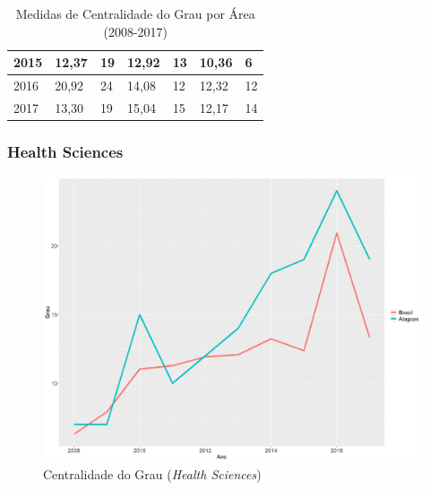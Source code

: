 \begin{table}[H]
\begin{tabular}{|l|l|l|l|l|l|l|}
		2015          & 12,37                                                  & 19                                                      & 12,92                                                     & 13                                                         & 10,36                                                       & 6                                                           \\ \hline
		2016          & 20,92                                                  & 24                                                      & 14,08                                                     & 12                                                         & 12,32                                                       & 12                                                          \\ \hline
		2017          & 13,30                                                  & 19                                                      & 15,04                                                     & 15                                                         & 12,17                                                       & 14                                                          \\ \hline
	\end{tabular}
	\caption{Medidas de Centralidade do Grau por Área (2008-2017)}
	\label{degree-tab}
\end{table}

\subsubsection{Health Sciences}

\begin{figure}[H]
\centering
\includegraphics[scale=0.4]{Imagens/graf-linha-degree-br-al.pdf}
\caption{Centralidade do Grau (\textit{Health Sciences})}
\label{degree-health}
\end{figure}

